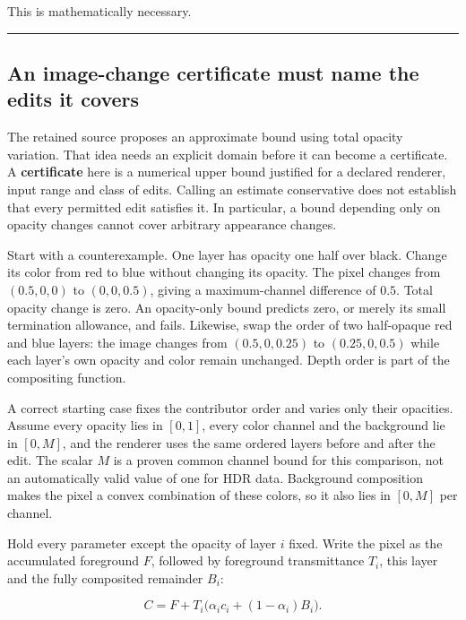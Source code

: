 This is mathematically necessary.

\begin{center}\rule{0.5\linewidth}{0.5pt}\end{center}

\subsection{An image-change certificate must name the edits it covers}\label{06-engine-ii-ch045-an-image-change-certificate-must-name-the-edits-it-covers}

The retained source proposes an approximate bound using total opacity variation. That idea needs an explicit domain before it can become a certificate. A \textbf{certificate} here is a numerical upper bound justified for a declared renderer, input range and class of edits. Calling an estimate conservative does not establish that every permitted edit satisfies it. In particular, a bound depending only on opacity changes cannot cover arbitrary appearance changes.

Start with a counterexample. One layer has opacity one half over black. Change its color from red to blue without changing its opacity. The pixel changes from \((0.5,0,0)\) to \((0,0,0.5)\), giving a maximum-channel difference of \(0.5\). Total opacity change is zero. An opacity-only bound predicts zero, or merely its small termination allowance, and fails. Likewise, swap the order of two half-opaque red and blue layers: the image changes from \((0.5,0,0.25)\) to \((0.25,0,0.5)\) while each layer's own opacity and color remain unchanged. Depth order is part of the compositing function.

A correct starting case fixes the contributor order and varies only their opacities. Assume every opacity lies in \([0,1]\), every color channel and the background lie in \([0,M]\), and the renderer uses the same ordered layers before and after the edit. The scalar \(M\) is a proven common channel bound for this comparison, not an automatically valid value of one for HDR data. Background composition makes the pixel a convex combination of these colors, so it also lies in \([0,M]\) per channel.

Hold every parameter except the opacity of layer \(i\) fixed. Write the pixel as the accumulated foreground \(F\), followed by foreground transmittance \(T_i\), this layer and the fully composited remainder \(B_i\):

\[
C=F+T_i\bigl(\alpha_i c_i+(1-\alpha_i)B_i\bigr).
\]

